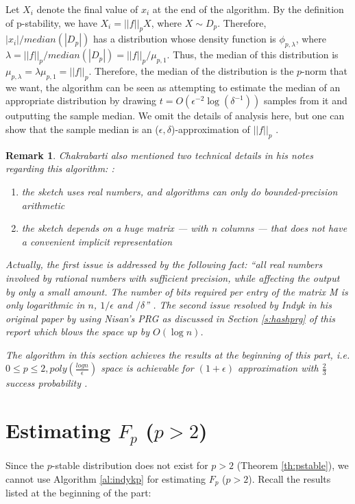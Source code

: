 \documentclass[11pt]{article}
\theoremstyle{plain}
\newtheorem{remark}[theorem]{Remark}
\begin{document}
Let $X_i$ denote the final value of $x_i$ at the end of the algorithm. By the 
definition of p-stability, we have $X_i=||f||_p X$, where $X\sim D_p$. 
Therefore, $|x_i|/median(|D_p|)$ has a  distribution whose density function is 
$\phi_{p,\lambda}$, where 
$\lambda=||f||_p/median(|D_p|)=||f||_p/\mu_{p,1}$. Thus, the median of this 
distribution is $\mu_{p,\lambda}=\lambda\mu_{p,1}=||f||_p$. Therefore, the 
median of the distribution is the $p$-norm that we want, the algorithm can 
be seen as attempting to estimate the median of an appropriate distribution 
by drawing $t=O(\epsilon^{-2}\log(\delta^{-1}))$ samples from it and 
outputting the sample median. We omit the details of analysis here, but one 
can show that the sample median is an ($\epsilon, \delta$)-approximation of 
$||f||_p$ \cite{Cha2015-notes}.

\begin{remark}
Chakrabarti also mentioned two technical details in his notes regarding this 
algorithm:
:\begin{enumerate}
	\item  the sketch uses real numbers, and algorithms can only do 
	bounded-precision 
	arithmetic
	\item the sketch depends on a huge matrix — with n columns — that does not 
	have 
	a convenient implicit representation
\end{enumerate}

Actually, the first issue is addressed by the following fact: ``all real numbers 
involved 
by rational numbers with sufficient precision, while affecting the
output by only a small amount. The number of bits required per entry of the 
matrix M 
is only logarithmic in $n$, $1/\epsilon$ and $/\delta$'' \cite{Cha2015-notes}. 
The 
second issue resolved by Indyk in his original paper by using Nisan's PRG as 
discussed in Section \ref{s:hashprg} of this report which blows the space up by 
$O(\log n)$. 

The algorithm in this section achieves the results at the beginning of this 
part, i.e. 
$0 \leq p \leq 2, poly(\frac{logn}{\epsilon})$ space is achievable for 
$(1+\epsilon)$ approximation with $\frac{2}{3}$ success probability 
\cite{AMS99,Indyk2006-prg}.
\end{remark}

\section{Estimating $F_p$ ($p>2$)}
\label{s:fp>2}
Since the $p$-stable distribution does not exist for $p>2$ (Theorem 
\ref{th:pstable}), we cannot use Algorithm \ref{al:indykp} for estimating $F_p$ 
($p>2$). Recall the results listed at the beginning of the part: 
\end{document}
